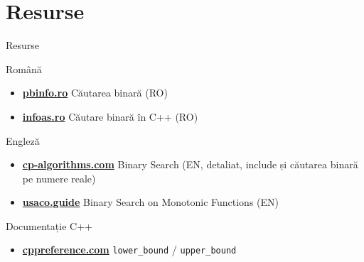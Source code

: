 \documentclass{beamer}
\begin{document}
\section{Resurse}

\begin{frame}{Resurse}
  \begin{block}{Română}
    \begin{itemize}\footnotesize\itemsep0pt
      \item \href{https://www.pbinfo.ro/articole/3633/cautarea-binara}{\textbf{pbinfo.ro}} \textemdash{} Căutarea binară (RO)
      \item \href{https://infoas.ro/lectie/122/cautare-binara-in-c}{\textbf{infoas.ro}} \textemdash{} Căutare binară în C++ (RO)
    \end{itemize}
  \end{block}
  \vspace{-6pt}
  \begin{block}{Engleză}
    \begin{itemize}\footnotesize\itemsep0pt
      \item \href{https://cp-algorithms.com/num_methods/binary_search.html}{\textbf{cp-algorithms.com}} \textemdash{} Binary Search (EN, detaliat, include și căutarea binară pe numere reale)
      \item \href{https://usaco.guide/silver/binary-search}{\textbf{usaco.guide}} \textemdash{} Binary Search on Monotonic Functions (EN)
    \end{itemize}
  \end{block}
  \vspace{-6pt}
  \begin{block}{Documentație C++}
    \begin{itemize}\footnotesize\itemsep0pt
      \item \href{https://en.cppreference.com/w/cpp/algorithm/lower_bound.html}{\textbf{cppreference.com}} \textemdash{} \texttt{lower\_bound} / \texttt{upper\_bound}

\end{itemize}
\end{block}
\end{frame}
\end{document}
